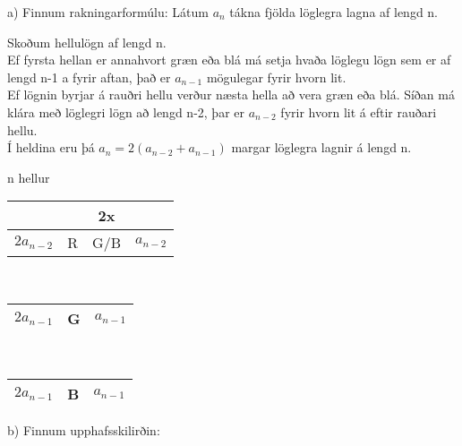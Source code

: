 a) Finnum rakningarformúlu: Látum $a_n$ tákna fjölda löglegra lagna af lengd n.
\begin{multicols}{2}
    \hspace*{-1.3em}Skoðum hellulögn af lengd n.\\
    Ef fyrsta hellan er annahvort græn eða blá má setja hvaða löglegu lögn sem er af lengd n-1 a fyrir aftan, það er $a_{n-1}$ mögulegar fyrir hvorn lit.\\
    Ef lögnin byrjar á rauðri hellu verður næsta hella að vera græn eða blá. Síðan má klára með löglegri lögn að lengd n-2, þar er $a_{n-2}$ fyrir hvorn lit á eftir rauðari hellu.\\
    Í heldina eru þá $a_n = 2(a_{n-2}+ a_{n-1})$ margar löglegra lagnir á lengd n.

    \columnbreak

    \begin{center}
        n hellur
    \end{center}
    \hspace*{4.3em}\begin{tabular}{ c|c|c|c| }
        & & 2x
        \\\hline
        $2a_{n-2}$ & R & G/B & \hspace*{1em}$a_{n-2}$ \hspace*{1em}
        \\\hline
    \end{tabular}\vspace*{1em}\\ 
    \hspace*{4.3em}\begin{tabular}{ c|c|c| }
        \hline
        $2a_{n-1}$ & G & \hspace*{1em}$a_{n-1}$ \hspace*{1em}
        \\\hline
    \end{tabular}\vspace*{1em}\\ 
    \hspace*{4.3em}\begin{tabular}{ c|c|c| }
        \hline
        $2a_{n-1}$ & B & \hspace*{1em}$a_{n-1}$ \hspace*{1em}
        \\\hline
    \end{tabular}
\end{multicols}

b) Finnum upphafsskilirðin: 

